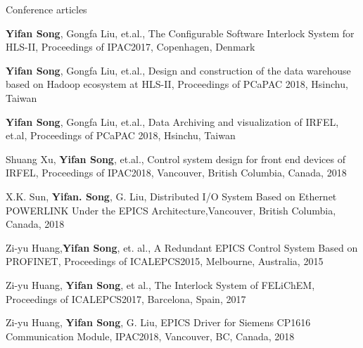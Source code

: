 \begin{cventries}
\cventry
   {Conference articles} %
   {} %
   {} %
   {} %
   {
   	\begin{cvitems} %
   		\item {\textbf{Yifan Song}, Gongfa Liu, et.al., The Configurable Software Interlock System for HLS-II, Proceedings of IPAC2017, Copenhagen, Denmark}
   		\item {\textbf{Yifan Song}, Gongfa Liu, et.al., Design and construction of the data warehouse based on Hadoop ecosystem at HLS-II, Proceedings of PCaPAC 2018, Hsinchu, Taiwan}
   		\item {\textbf{Yifan Song}, Gongfa Liu, et.al., Data Archiving and visualization of IRFEL, et.al, Proceedings of PCaPAC 2018, Hsinchu, Taiwan}
   		\item {Shuang Xu, \textbf{Yifan Song}, et.al., Control system design for front end devices of IRFEL, Proceedings of IPAC2018, Vancouver, British Columbia, Canada, 2018}
   		\item{X.K. Sun, \textbf{Yifan. Song}, G. Liu, Distributed I/O System Based on Ethernet POWERLINK Under the EPICS Architecture,Vancouver, British Columbia, Canada, 2018}
   		\item {Zi-yu Huang,\textbf{Yifan Song}, et. al., A Redundant EPICS Control System Based on PROFINET, Proceedings of ICALEPCS2015, Melbourne, Australia, 2015}
   		\item {Zi-yu Huang, \textbf{Yifan Song}, et al., The Interlock System of FELiChEM, Proceedings of ICALEPCS2017, Barcelona, Spain, 2017}
   		\item {Zi-yu Huang, \textbf{Yifan Song}, G. Liu, EPICS Driver for Siemens CP1616 Communication Module, IPAC2018, Vancouver, BC, Canada, 2018}
   	\end{cvitems}
   }   
\end{cventries}
